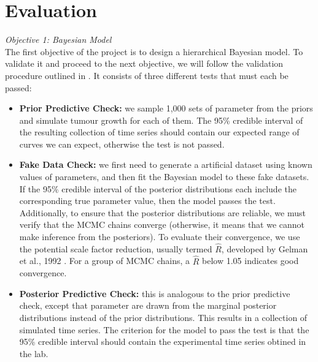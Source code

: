 \documentclass[11pt]{article}
\begin{document}
\section{Evaluation}\label{sec:eval}
\textit{Objective 1: Bayesian Model}\\[3pt]
    The first objective of the project is to design a hierarchical Bayesian model. To validate it and proceed to the next objective, we will follow the validation procedure outlined in \cite{gelman2020bayesian}. It consists of three different tests that must each be passed:
\begin{itemize}
    \item \textbf{Prior Predictive Check:} we sample 1,000 sets of parameter from the priors and simulate tumour growth for each of them. The 95\% credible interval of the resulting collection of time series should contain our expected range of curves we can expect, otherwise the test is not passed.
    \item \textbf{Fake Data Check:} we first need to generate a artificial dataset using known values of parameters, and then fit the Bayesian model to these fake datasets. If the 95\% credible interval of the posterior distributions each include the corresponding true parameter value, then the model passes the test. Additionally, to ensure that the posterior distributions are reliable, we must verify that the MCMC chains converge (otherwise, it means that we cannot make inference from the posteriors). To evaluate their convergence, we use the potential scale factor reduction, usually termed $\hat{R}$, developed by Gelman et al., 1992 \cite{rhat}. For a group of MCMC chains, a $\hat{R}$ below 1.05 indicates good convergence.
    \item \textbf{Posterior Predictive Check:} this is analogous to the prior predictive check, except that parameter are drawn from the marginal posterior distributions instead of the prior distributions. This results in a collection of simulated time series. The criterion for the model to pass the test is that the 95\% credible interval should contain the experimental time series obtined in the lab. 
\end{itemize}
\end{document}
